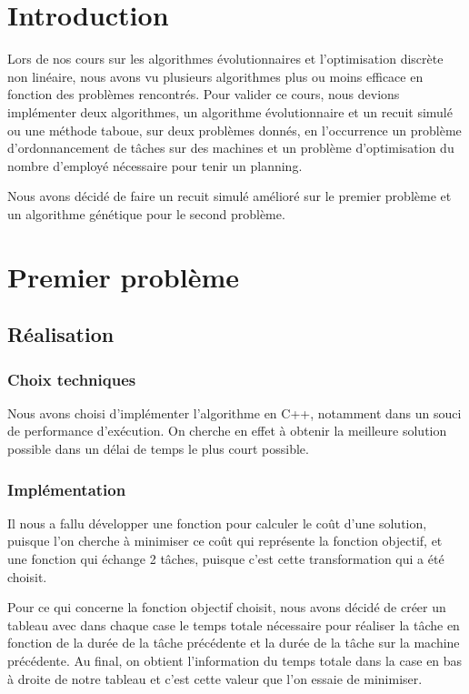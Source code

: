 \documentclass{report}
\begin{document}
\tableofcontents

\chapter{Introduction}
\minitoc
Lors de nos cours sur les algorithmes évolutionnaires et l'optimisation discrète non linéaire, nous avons vu plusieurs algorithmes plus ou moins efficace en fonction des problèmes rencontrés. Pour valider ce cours, nous devions implémenter deux algorithmes, un algorithme évolutionnaire et un recuit simulé ou une méthode taboue, sur deux problèmes donnés, en l'occurrence un problème d'ordonnancement de tâches sur des machines et un problème d'optimisation du nombre d'employé nécessaire pour tenir un planning.

Nous avons décidé de faire un recuit simulé amélioré sur le premier problème et un algorithme génétique pour le second problème.
\newpage

\chapter{Premier problème}
\minitoc
\section{Réalisation}
\subsection{Choix techniques}
Nous avons choisi d'implémenter l'algorithme en C++, notamment dans un souci de performance d’exécution. On cherche en effet à obtenir la meilleure solution possible dans un délai de temps le plus court possible.

\subsection{Implémentation}
Il nous a fallu développer une fonction pour calculer le coût d'une solution, puisque l'on cherche à minimiser ce coût qui représente la fonction objectif, et une fonction qui échange 2 tâches, puisque c'est cette transformation qui a été choisit.

Pour ce qui concerne la fonction objectif choisit, nous avons décidé de créer un tableau avec dans chaque case le temps totale nécessaire pour réaliser la tâche en fonction de la durée de la tâche précédente et la durée de la tâche sur la machine précédente. Au final, on obtient l'information du temps totale dans la case en bas à droite de notre tableau et c'est cette valeur que l'on essaie de minimiser.
\end{document}
